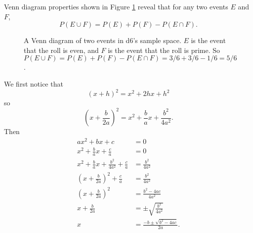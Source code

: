 \documentclass{book}
\begin{document}
\begin{exercise*}[\ref{q:cup}]
Venn diagram properties shown in Figure \ref{vennd} reveal that for any two events $E$ and $F$, \[P(E \cup F) = P(E) + P(F) - P(E \cap F).\]
\end{exercise*}

\begin{figure}[ht]
\centering

\caption{A Venn diagram of two events in d6's sample space. $E$ is the event that the roll is even, and $F$ is the event that the roll is prime. So $P(E \cup F) = P(E) + P(F) - P(E \cap F) = 3/6 + 3/6 - 1/6 = 5/6$.}
\label{vennd}
\end{figure}

\begin{exercise*}[{\ref{completesquare}}] We first notice that
\[(x + h)^2 = x^2 + 2hx + h^2\] so \[\left(x + \frac{b}{2a}\right)^2 = x^2 + \frac{b}{a}x + \frac{b^2}{4a^2}.\] Then
\begin{align*}
ax^2 + bx + c &= 0\\
x^2 + \frac{b}{a}x + \frac{c}{a} &= 0\\
x^2 + \frac{b}{a}x + \frac{b^2}{4a^2} + \frac{c}{a} &= \frac{b^2}{4a^2}\\
\left(x + \frac{b}{2a}\right)^2 + \frac{c}{a} &= \frac{b^2}{4a^2}\\
\left(x + \frac{b}{2a}\right)^2 &= \frac{b^2-4ac}{4a^2}\\
x + \frac{b}{2a} &= \pm\sqrt{\frac{b^2}{4a^2}}\\
x &= \frac{-b \pm \sqrt{b^2 - 4ac}}{2a}.
\end{align*}
\end{exercise*}
\end{document}
